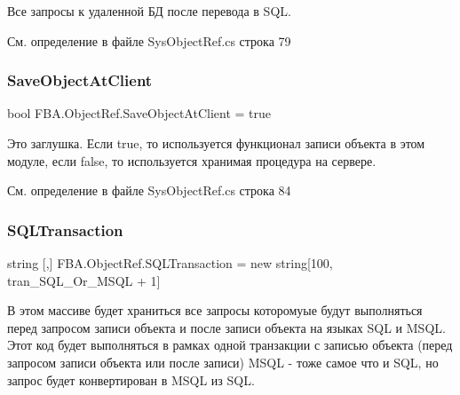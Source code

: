 Все запросы к удаленной БД после перевода в S\+QL. ~\newline




См. определение в файле Sys\+Object\+Ref.\+cs строка 79

\mbox{\label{class_f_b_a_1_1_object_ref_af9c252926768a61635f5f50a439f37ae}} 
\subsubsection{\texorpdfstring{Save\+Object\+At\+Client}{SaveObjectAtClient}}
{\footnotesize\ttfamily bool F\+B\+A.\+Object\+Ref.\+Save\+Object\+At\+Client = true}



Это заглушка. Если true, то используется функционал записи объекта в этом модуле, если false, то используется хранимая процедура на сервере. 



См. определение в файле Sys\+Object\+Ref.\+cs строка 84

\mbox{\label{class_f_b_a_1_1_object_ref_aa89efd334f666aba664c8a3363e48b83}} 
\subsubsection{\texorpdfstring{S\+Q\+L\+Transaction}{SQLTransaction}}
{\footnotesize\ttfamily string \mbox{[},\mbox{]} F\+B\+A.\+Object\+Ref.\+S\+Q\+L\+Transaction = new string\mbox{[}100, tran\+\_\+\+S\+Q\+L\+\_\+\+Or\+\_\+\+M\+S\+QL + 1\mbox{]}}



В этом массиве будет храниться все запросы которомуые будут выполняться перед запросом записи объекта и после записи объекта на языках S\+QL и M\+S\+QL. Этот код будет выполняться в рамках одной транзакции с записью объекта (перед запросом записи объекта или после записи) M\+S\+QL -\/ тоже самое что и S\+QL, но запрос будет конвертирован в M\+S\+QL из S\+QL. ~\newline




